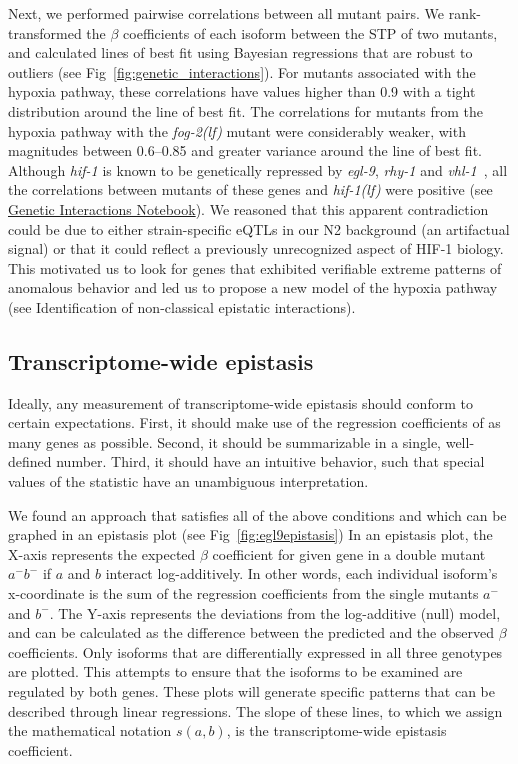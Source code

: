 \documentclass[9pt,twocolumn,twoside]{pnas-new}
\newcommand{\gene}[1]{\mbox{\emph{#1}}}
\newcommand{\fog}{\gene{fog-2(lf)}}
\newcommand{\hif}{\gene{hif-1(lf)}}
\newcommand{\hifp}{HIF-1}
\begin{document}
Next, we performed pairwise correlations between all mutant pairs. We
rank-transformed the $\beta$ coefficients of each isoform between the STP of two
mutants, and calculated lines of best fit using Bayesian regressions that are
robust to outliers (see Fig~\ref{fig:genetic_interactions}). For mutants
associated with the hypoxia pathway, these correlations have values higher than
0.9 with a tight distribution around the line of best fit. The correlations for
mutants from the hypoxia pathway with the \fog{} mutant were considerably
weaker, with magnitudes between 0.6--0.85 and greater variance around the line
of best fit. Although \gene{hif-1} is known to be genetically repressed by
\gene{egl-9}, \gene{rhy-1} and \gene{vhl-1}~\cite{Epstein2001,Shen2006}, all the
correlations between mutants of these genes and \hif{} were positive (see
\href{https://wormlabcaltech.github.io/mprsq/analysis_notebooks/2_predict_interactions.html}
{Genetic Interactions Notebook}). We reasoned
that this apparent contradiction could be due to either strain-specific eQTLs in
our N2 background (an artifactual signal) or that it could reflect a previously
unrecognized aspect of \hifp{} biology. This motivated us to look for genes that
exhibited verifiable extreme patterns of anomalous behavior
and led us to propose a new model of the hypoxia pathway (see Identification of
non-classical epistatic interactions).

\subsection*{Transcriptome-wide epistasis}
Ideally, any measurement of transcriptome-wide epistasis should conform to
certain expectations. First, it should make use of the regression coefficients
of as many genes as possible. Second, it should be summarizable in a single,
well-defined number. Third, it should have an intuitive behavior, such that
special values of the statistic have an unambiguous interpretation.

We found an approach that satisfies all of the above conditions and which can
be graphed in an epistasis plot (see Fig~\ref{fig:egl9epistasis})
In an epistasis plot, the X-axis represents the expected $\beta$ coefficient for
given gene in a double
mutant $a^-b^-$ if $a$ and $b$ interact log-additively. In other words, each
individual isoform's x-coordinate is the sum of the regression coefficients from
the single mutants $a^-$ and $b^-$. The Y-axis represents the deviations from
the log-additive (null) model, and can be calculated as the difference between
the predicted and the observed $\beta$ coefficients.
Only isoforms that are differentially expressed in all three genotypes are plotted.
This attempts to ensure that the isoforms to be examined are regulated by both genes.
These plots will generate specific patterns that can be described through linear
regressions. The slope of these lines, to which we assign the mathematical
notation $s({a,b})$, is the transcriptome-wide epistasis coefficient.
\end{document}
